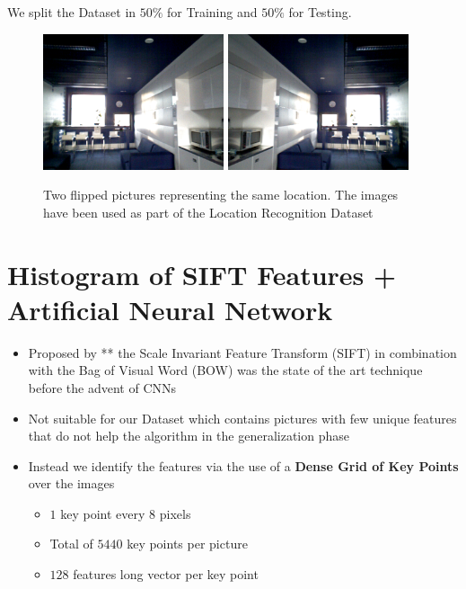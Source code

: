 \documentclass[a0, portrait]{IWIposter}
\begin{document}
\begin{multicols}{3}
\begin{itemize}
We split the Dataset in $50\%$ for Training and $50\%$ for Testing.
\end{itemize}

\begin{figure}
        \includegraphics[width=0.475\textwidth]{Position1.png}
        \hfill
        \includegraphics[width=0.475\textwidth]{Position2.png}
	\caption{Two flipped pictures representing the same location. The images have been used as part of the Location Recognition Dataset}
	\label{fig:FlippedExamples}
\end{figure}


\section*{Histogram of SIFT Features + Artificial Neural Network}
\begin{itemize}
	\item Proposed by ** the Scale Invariant Feature Transform (SIFT) in combination with the Bag of Visual Word (BOW) was the state of the art technique before the advent of CNNs
	\item Not suitable for our Dataset which contains pictures with few unique features that do not help the algorithm in the generalization phase
	\item Instead we identify the features via the use of a \textbf{Dense Grid of Key Points} over the images

	\begin{itemize}
		\item $1$ key point every $8$ pixels
		\item Total of $5440$ key points per picture
		\item $128$ features long vector per key point
	\end{itemize}


\end{itemize}
\end{multicols}
\end{document}
